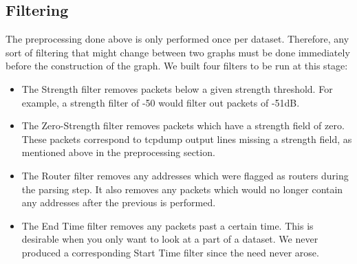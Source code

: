 \documentclass[11pt,journal,compsoc]{IEEEtran} %
\begin{document}
\subsection*{Filtering}
    The preprocessing done above is only performed once per dataset.
    Therefore, any sort of filtering that might change between two graphs must be done immediately before the construction of the graph.
    We built four filters to be run at this stage:
    \begin{itemize}
    \item The Strength filter removes packets below a given strength threshold.
      For example, a strength filter of -50 would filter out packets of -51dB.
    \item The Zero-Strength filter removes packets which have a strength field of zero.
      These packets correspond to tcpdump output lines missing a strength field, as mentioned above in the preprocessing section.
    \item The Router filter removes any addresses which were flagged as routers during the parsing step.
      It also removes any packets which would no longer contain any addresses after the previous is performed.
    \item The End Time filter removes any packets past a certain time.
      This is desirable when you only want to look at a part of a dataset.
      We never produced a corresponding Start Time filter since the need never arose.
    \end{itemize}
\end{document}
